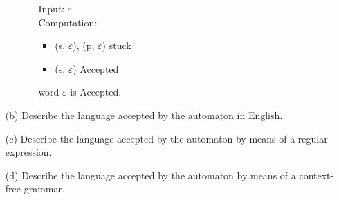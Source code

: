 \documentclass[11pt]{article}
\begin{document}
\begin{itemize}
\begin{itemize}
{{{\begin{itemize}
             \item[]{
             Input: $\varepsilon$\\
             Computation: 
             	\begin{itemize}
			\item{
				(s, $\varepsilon$), (p, $\varepsilon$) stuck
			}
			\item{
				(s, $\varepsilon$) Accepted\\
			}			
		\end{itemize}
		word  $\varepsilon$ is Accepted.\\
             }           
          \end{itemize}
      }}
   }
\end{itemize}

\item[(b)]
Describe the language accepted by the automaton in English.
\begin{itemize}
    \item[] {
   }
\end{itemize}

\item[(c)]
Describe the language accepted by the automaton by means of a
regular expression.
\begin{itemize}
    \item[] {
   }
\end{itemize}

\item[(d)]
Describe the language accepted by the automaton by means of a context-free grammar.
\end{itemize}
\begin{itemize}
    \item[] {
   }
\end{itemize}
\end{document}
